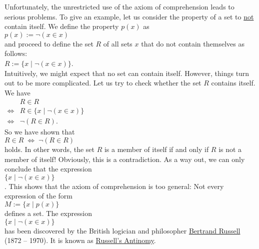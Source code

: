 Unfortunately, the unrestricted use of the axiom of comprehension leads to serious problems.  To give an
example, let us consider the property of a set to \underline{not} contain itself.  We define the property
$p(x)$ as
\\[0.2cm]
\hspace*{1.3cm}
 $p(x) := \neg(x \in x)$ 
\\[0.2cm]
and proceed to define the set $R$ of all sets $x$ that do not contain themselves as follows:
\\[0.2cm]
\hspace*{1.3cm} 
$R := \{ x \;|\; \neg (x \in x) \}$.  
\\[0.2cm]
Intuitively, we might expect that no set can contain itself.  However, things turn out to be more complicated.
Let us try to check whether the set $R$ contains itself.  We have
\\[0.2cm]
\hspace*{1.3cm}
$
\begin{array}{cl}
                  & R \in R \\[0.2cm] 
  \Leftrightarrow & R \in \bigl\{ x \;|\; \neg (x \in x) \bigr\} \\[0.2cm] 
  \Leftrightarrow & \neg (R \in R).
\end{array}
$
\\[0.2cm]
So we have shown that
\\[0.2cm]
\hspace*{1.3cm}
$R \in R \;\Leftrightarrow\; \neg(R \in R)$
\\[0.2cm]
holds.  In other words, the set $R$ is a member of itself if and only if $R$ is not a member of itself!
Obviously, this is a contradiction.  As a way out, we can only conclude that the expression \\[0.2cm]
\hspace*{1.3cm} $\{ x \mid \neg (x \in x) \}$ \\[0.2cm]
.  This shows that the axiom of comprehension is too general:  Not every expression of the form 
\\[0.2cm] 
\hspace*{1.3cm}
$M := \{ x \mid p(x) \}$ 
\\[0.2cm]
defines a set.  The expression
\\[0.2cm]
\hspace*{1.3cm}
$\bigl\{x \mid \neg(x \in x)\bigr\}$
\\[0.2cm]
has been discovered by the British logician and philosopher 
\href{http://de.wikipedia.org/wiki/Bertrand_Russell}{Bertrand Russell} (1872 -- 1970).  It is known as
\href{http://de.wikipedia.org/wiki/Russellsche_Antinomy}{Russell's Antinomy}. 

